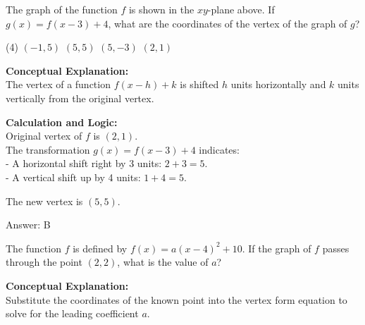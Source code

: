 \documentclass[11pt,paper=a4,answers]{exam}
\begin{document}
\begin{questions}
\question
\begin{center}
\end{center}
The graph of the function $f$ is shown in the $xy$-plane above. If $g(x) = f(x-3) + 4$, what are the coordinates of the vertex of the graph of $g$?
\begin{tasks}(4)
    \task $(-1, 5)$
    \task $(5, 5)$
    \task $(5, -3)$
    \task $(2, 1)$
\end{tasks}

\begin{solution}
\textbf{Conceptual Explanation:} \\
The vertex of a function $f(x-h)+k$ is shifted $h$ units horizontally and $k$ units vertically from the original vertex.

\vspace{20pt}

\textbf{Calculation and Logic:} \\
Original vertex of $f$ is $(2, 1)$. \\
The transformation $g(x) = f(x-3) + 4$ indicates: \\
- A horizontal shift right by 3 units: $2 + 3 = 5$. \\
- A vertical shift up by 4 units: $1 + 4 = 5$.

\vspace{10pt}

The new vertex is $(5, 5)$.

\vspace{25pt}

Answer: \colorbox{yellow!100}{B}
\end{solution}

\vspace{40pt}

\question
The function $f$ is defined by $f(x) = a(x-4)^2 + 10$. If the graph of $f$ passes through the point $(2, 2)$, what is the value of $a$?

\begin{solution}
\textbf{Conceptual Explanation:} \\
Substitute the coordinates of the known point into the vertex form equation to solve for the leading coefficient $a$.


\end{solution}
\end{questions}
\end{document}
